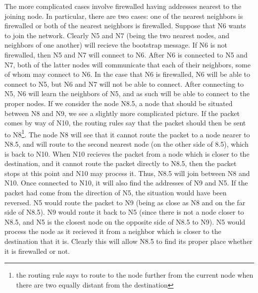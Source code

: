\documentclass[11pt]{article}
\begin{document}
The more complicated cases involve firewalled having addresses nearest to the
joining node.  In particular, there are two cases: one of the nearest
neighbors is firewalled or both of the nearest neighbors is firewalled.
Suppose that N6 wants to join the network.  Clearly N5 and N7 (being the two
nearest nodes, and neighbors of one another) will recieve the bootstrap
message.  If N6 is not firewalled, then N5 and N7 will connect to N6.  After
N6 is connected to N5 and N7, both of the latter nodes will communicate that
each of their neighbors, some of whom may connect to N6.  In the case that N6
is firewalled, N6 will be able to connect to N5, but N6 and N7 will not be
able to connect.  After connecting to N5, N6 will learn the neighbors of N5,
and as such will be able to connect to the proper nodes.  If we consider the
node N8.5, a node that should be situated between N8 and N9, we see a slightly
more complicated picture.  If the packet comes by way of N10, the routing
rules say that the packet should then be sent to N8\footnote{the routing
rule says to route to the node further from the current node when there are two
equally distant from the destination}.  The node N8 will see that it cannot
route the packet to a node nearer to N8.5, and will route to the second
nearest node (on the other side of 8.5), which is back to N10.
When N10 recieves the packet from a node which is closer to the destination,
and it cannot route the packet directly to N8.5, then the packet stops at this
point and N10 may process it.
Thus, N8.5 will join
between N8 and N10.  Once connected to N10, it will also find the addresses of
N9 and N5.  If the packet had come from the direction of N5, the situation
would have been reversed.  N5 would route the packet to N9 (being as close as
N8 and on the far side of N8.5).  N9 would route it back to N5 (since there
is not a node closer to N8.5, and N5 is the closest node on the opposite side
of N8.5 to N9).  N5 would process the node as it recieved it from a neighbor
which is closer to the destination that it is.
Clearly this will allow N8.5 to find its proper place whether it
is firewalled or not.
 
\end{document}
